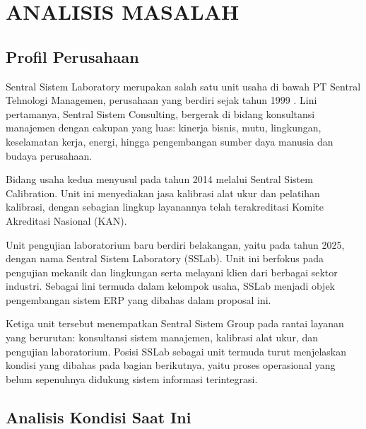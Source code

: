 \chapter{ANALISIS MASALAH}
\label{chap:analisis-masalah}

\section{Profil Perusahaan}

Sentral Sistem Laboratory merupakan salah satu unit usaha di bawah PT Sentral Tehnologi Managemen, perusahaan yang berdiri sejak tahun 1999 \cite{ssl_website}. Lini pertamanya, Sentral Sistem Consulting, bergerak di bidang konsultansi manajemen dengan cakupan yang luas: kinerja bisnis, mutu, lingkungan, keselamatan kerja, energi, hingga pengembangan sumber daya manusia dan budaya perusahaan.

Bidang usaha kedua menyusul pada tahun 2014 melalui Sentral Sistem Calibration. Unit ini menyediakan jasa kalibrasi alat ukur dan pelatihan kalibrasi, dengan sebagian lingkup layanannya telah terakreditasi Komite Akreditasi Nasional (KAN).

Unit pengujian laboratorium baru berdiri belakangan, yaitu pada tahun 2025, dengan nama Sentral Sistem Laboratory (SSLab). Unit ini berfokus pada pengujian mekanik dan lingkungan serta melayani klien dari berbagai sektor industri. Sebagai lini termuda dalam kelompok usaha, SSLab menjadi objek pengembangan sistem ERP yang dibahas dalam proposal ini.

Ketiga unit tersebut menempatkan Sentral Sistem Group pada rantai layanan yang berurutan: konsultansi sistem manajemen, kalibrasi alat ukur, dan pengujian laboratorium. Posisi SSLab sebagai unit termuda turut menjelaskan kondisi yang dibahas pada bagian berikutnya, yaitu proses operasional yang belum sepenuhnya didukung sistem informasi terintegrasi.

\section{Analisis Kondisi Saat Ini}

